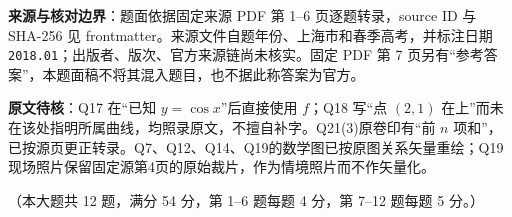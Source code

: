 

\begin{gktip}
\textbf{来源与核对边界}：题面依据固定来源 PDF 第 1–6 页逐题转录，source ID 与 SHA-256 见 frontmatter。来源文件自题年份、上海市和春季高考，并标注日期 \texttt{2018.01}；出版者、版次、官方来源链尚未核实。固定 PDF 第 7 页另有“参考答案”，本题面稿不将其混入题目，也不据此称答案为官方。

\textbf{原文待核}：Q17 在“已知 $y=\cos x$”后直接使用 $f$；Q18 写“点 $(2,1)$ 在上”而未在该处指明所属曲线，均照录原文，不擅自补字。Q21(3)原卷印有“前 $n$ 项和”，已按源页更正转录。Q7、Q12、Q14、Q19的数学图已按原图关系矢量重绘；Q19现场照片保留固定源第4页的原始裁片，作为情境照片而不作矢量化。
\end{gktip}


（本大题共 12 题，满分 54 分，第 1–6 题每题 4 分，第 7–12 题每题 5 分。）

